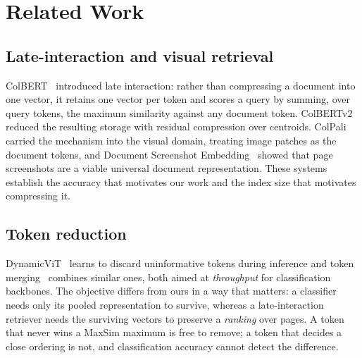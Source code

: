 \documentclass[conference]{IEEEtran}
\begin{document}
\section{Related Work}

\subsection{Late-interaction and visual retrieval}
ColBERT~\cite{colbert} introduced late interaction: rather than compressing a
document into one vector, it retains one vector per token and scores a query by
summing, over query tokens, the maximum similarity against any document token.
ColBERTv2~\cite{colbertv2} reduced the resulting storage with residual
compression over centroids. ColPali~\cite{colpali} carried the mechanism into the
visual domain, treating image patches as the document tokens, and Document
Screenshot Embedding~\cite{dse} showed that page screenshots are a viable
universal document representation. These systems establish the accuracy that
motivates our work and the index size that motivates compressing it.

\subsection{Token reduction}
DynamicViT~\cite{dynamicvit} learns to discard uninformative tokens during
inference and token merging~\cite{tome} combines similar ones, both aimed at
\emph{throughput} for classification backbones. The objective differs from ours
in a way that matters: a classifier needs only its pooled representation to
survive, whereas a late-interaction retriever needs the surviving vectors to
preserve a \emph{ranking} over pages. A token that never wins a MaxSim maximum is
free to remove; a token that decides a close ordering is not, and classification
accuracy cannot detect the difference.
\end{document}
